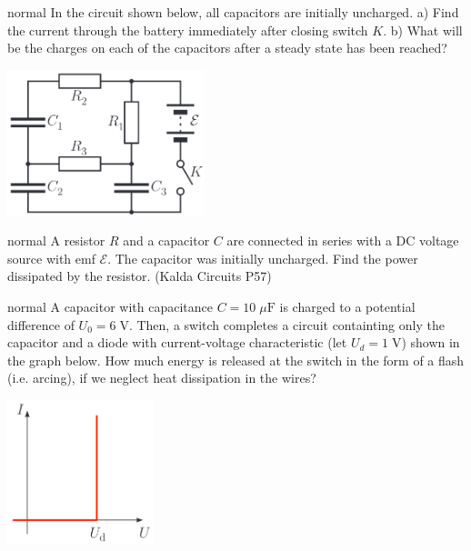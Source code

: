 \hypertarget{P45}{}
\begin{solution}{normal} %
In the circuit shown below, all capacitors are initially uncharged. a) Find the current through the battery immediately after closing switch $K$. b) What will be the charges on each of the capacitors after a steady state has been reached?
\begin{center}
    \includegraphics[width=0.43\textwidth]{S2 Figures/S2-45.png}
\end{center}
\end{solution}

\hypertarget{P46}{}
\begin{solution}{normal} %
A resistor $R$ and a capacitor $C$ are connected in series with a DC voltage source with emf $\mathcal{E}$. The capacitor was initially uncharged. Find the power dissipated by the resistor. (Kalda Circuits P57)
\end{solution}

\hypertarget{P47}{}
\begin{solution}{normal} %
A capacitor with capacitance $C=10\;\mu\text{F}$ is charged to a potential difference of $U_0=6\;\text{V}$. Then, a switch completes a circuit containting only the capacitor and a diode with current-voltage characteristic (let $U_d=1\;\text{V}$) shown in the graph below. How much energy is released at the switch in the form of a flash (i.e. arcing), if we neglect heat dissipation in the wires?
\begin{center}
    \includegraphics[width=0.32\textwidth]{S1 Figures/S1-35-2.png}
\end{center}
\end{solution}

